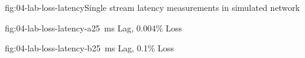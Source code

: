 
\begin{myFigure}{fig:04-lab-loss-latency}{Single stream latency measurements in simulated network}
\begin{mySubfigure}{0.49\linewidth}{fig:04-lab-loss-latency-a}{\SI{25}{\milli\second} Lag, 0.004\% Loss}
\footnotesize

\end{mySubfigure}
\begin{mySubfigure}{0.49\linewidth}{fig:04-lab-loss-latency-b}{\SI{25}{\milli\second} Lag, 0.1\% Loss}
\footnotesize

\end{mySubfigure}
\end{myFigure}

